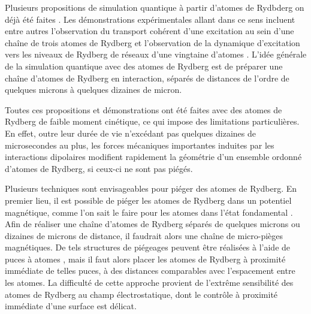 \bigskip

Plusieurs propositions de simulation quantique à partir d'atomes de Rydbderg on déjà été faites \cite{SchAPnleber2015,Lesanovsky2012,Dauphin2012,Hague2013}.
Les démonstrations expérimentales allant dans ce sens incluent entre autres l'observation du transport cohérent d'une excitation au sein d'une chaîne de trois atomes de Rydberg \cite{Barredo2015} et l'observation de la dynamique d'excitation vers les niveaux de Rydberg de réseaux d'une vingtaine d'atomes \cite{Labuhn2016}.
L'idée générale de la simulation quantique avec des atomes de Rydberg est de préparer une chaîne d'atomes de Rydberg en interaction, séparés de distances de l'ordre de quelques microns à quelques dizaines de micron.

Toutes ces propositions et démonstrations ont été faites avec des atomes de Rydberg de faible moment cinétique, ce qui impose des limitations particulières.
En effet, outre leur durée de vie n'excédant pas quelques dizaines de microsecondes au plus, les forces mécaniques importantes induites par les interactions dipolaires modifient rapidement la géométrie d'un ensemble ordonné d'atomes de Rydberg, si ceux-ci ne sont pas piégés.

Plusieurs techniques sont envisageables pour piéger des atomes de Rydberg.
En premier lieu, il est possible de piéger les atomes de Rydberg dans un potentiel magnétique, comme l'on sait le faire pour les atomes dans l'état fondamental \cite{MX_RAITHELTRAPPERDYD05}.
Afin de réaliser une chaîne d'atomes de Rydberg séparés de quelques microns ou dizaines de microns de distance, il faudrait alors une chaîne de micro-pièges magnétiques.
De tels structures de piégeages peuvent être réalisées à l'aide de puces à atomes \cite{muller2010trapping}, mais il faut alors placer les atomes de Rydberg à proximité immédiate de telles puces, à des distances comparables avec l'espacement entre les atomes.
La difficulté de cette approche provient de l'extrême sensibilité des atomes de Rydberg au champ électrostatique, dont le contrôle à proximité immédiate d'une surface est délicat.

